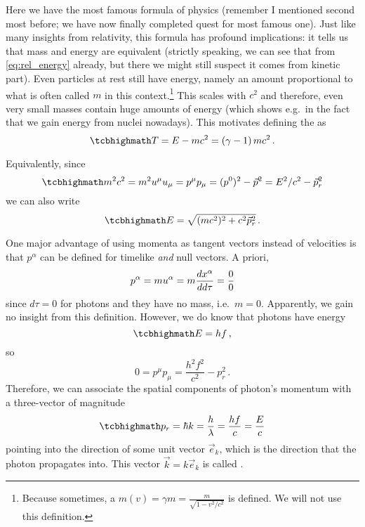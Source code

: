 \documentclass[ART_main.tex]{subfiles}
\begin{document}
Here we have the most famous formula of physics (remember I mentioned second most before; we have now finally completed quest for most famous one). Just like many insights from relativity, this formula has profound implications: it tells us that mass and energy are equivalent (strictly speaking, we can see that from \eqref{eq:rel_energy} already, but there we might still suspect it comes from kinetic part). Even particles at rest still have energy, namely an amount proportional to what is often called  $m$ in this context.\footnote{Because sometimes, a  $m(v) = \gamma m = \frac{m}{\sqrt{1 - v^2 / c^2}}$ is defined. We will not use this definition.} This  scales with $c^2$ and therefore, even very small masses contain huge amounts of energy (which shows e.g.~in the fact that we gain energy from nuclei nowadays). This motivates defining the  as
\begin{equation}\label{eq:rel_kin_energy}
	\eqbox{
	T = E - m c^2 = (\gamma - 1) \, m c^2
	} \, .
\end{equation}


Equivalently, since
\begin{equation}\label{eq:four_momentum_norm}
	\eqbox{
	m^2 c^2 = m^2 u^\mu u_\mu = p^\mu p_\mu = (p^0)^2 - \vec{p}^2 = E^2 / c^2 - \vec{p}_r^2
	}
\end{equation}
we can also write
\begin{equation}\label{eq:rel_energy_2}
	\eqbox{
	E = \sqrt{(m c^2)^2 + c^2 \vec{p}_r^2}
	} \, .
\end{equation}



One major advantage of using momenta as tangent vectors instead of velocities is that $p^\alpha$ can be defined for timelike \emph{and} null vectors. A priori,
\begin{equation*}
	p^\alpha = m u^\alpha = m \dv{x^\alpha}{d\tau} = \frac{0}{0}
\end{equation*}
since $d\tau = 0$ for photons and they have no mass, i.e.~$m = 0$. Apparently, we gain no insight from this definition. However, we do know that photons have energy
\begin{equation}
	\eqbox{
	E = h f
	} \, ,
\end{equation}
so
\begin{equation*}
	0 = p^\mu p_\mu = \frac{h^2 f^2}{c^2} - p_r^2 \, .
\end{equation*}
Therefore, we can associate the spatial components of photon's momentum with a three-vector of magnitude
\begin{equation}\label{eq:photon_momentum}
	\eqbox{
	p_r = \hbar k = \frac{h}{\lambda} = \frac{h f}{c} = \frac{E}{c}
	}
\end{equation}
pointing into the direction of some unit vector $\vec{e}_k$, which is the direction that the photon propagates into. This vector $\vec{k} = k \vec{e}_k$ is called .
\end{document}
